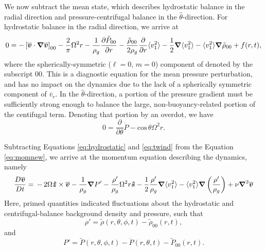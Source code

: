 We now subtract the mean state, which describes hydrostatic balance in the radial direction and pressure-centrifugal balance in the ${\hat{\theta}}$-direction.   For hydrostatic balance in the radial direction, we arrive at
\begin{equation}
\label{eq:hydrostatic}
0   =  - \left[\vvecbar\cdot\boldsymbol{\nabla}\vvecbar\right]_{00}
- \frac{2}{\pi}\Omega^2r
-\frac{1}{\rho_g}\frac{\partial \tilde{P}_{00}}{\partial r}  %
						        - \frac{\tilde{\rho}_{00}}{2\rho_g}\frac{\partial }{\partial r}\langle v_1^2\rangle
                                - \frac{1}{2}\boldsymbol{\nabla}\langle v_1^2\rangle
							- \langle v_1^2\rangle\boldsymbol{\nabla}\tilde{\rho}_{00}
							+ f(r,t),
\end{equation}
where the spherically-symmetric ($\ell=0$, $m=0$) component of denoted by the subscript 00.  This is a diagnostic equation for the mean pressure perturbation, and has no impact on the dynamics due to the lack of a spherically symmetric component of $\overline{v}_r$.  In the ${\hat{\theta}}$-direction, a portion of the pressure gradient must be sufficiently strong enough to balance the large, non-buoyancy-related portion of the centifugal term.  Denoting that portion by an overdot, we have
\begin{equation}
\label{eq:twind}
0 = \frac{\partial }{\partial\theta}\dot{{P}} -\mathrm{cos}\,\theta\Omega^2r.
\end{equation}

Subtracting Equations \ref{eq:hydrostatic} and \ref{eq:twind} from the Equation \ref{eq:momnew}, we arrive at the momentum equation describing the dynamics, namely
\begin{equation}
\frac{ D \vvecbar }{D t}   =  
\,-\, 2\Omega\boldsymbol{\hat{z}}\times\vvecbar 
-\frac{1}{\rho_g}\boldsymbol{\nabla}P'  %
-\frac{\rho'}{\rho_g}\Omega^2r\boldsymbol{\hat{s}}
						        - \frac{1}{2}\frac{\rho'}{\rho_g}\boldsymbol{\nabla}\langle v_1^2\rangle
							- \langle v_1^2\rangle\boldsymbol{\nabla}\left(\frac{\rho'}{\rho_g}\right)
+ \nu\boldsymbol{\nabla}^2\vvecbar
\end{equation}
Here, primed quantities indicated fluctuations about the hydrostatic and centrifugal-balance background density and pressure, such that
\begin{equation}
\rho' = \tilde{\rho}(r,\theta,\phi,t)-\tilde{\rho}_{00}(r,t),
\end{equation}
and
\begin{equation}
P' = \tilde{P}(r,\theta,\phi,t)-\dot{P}(r,\theta,t)-\tilde{P}_{00}(r,t).
\end{equation}

